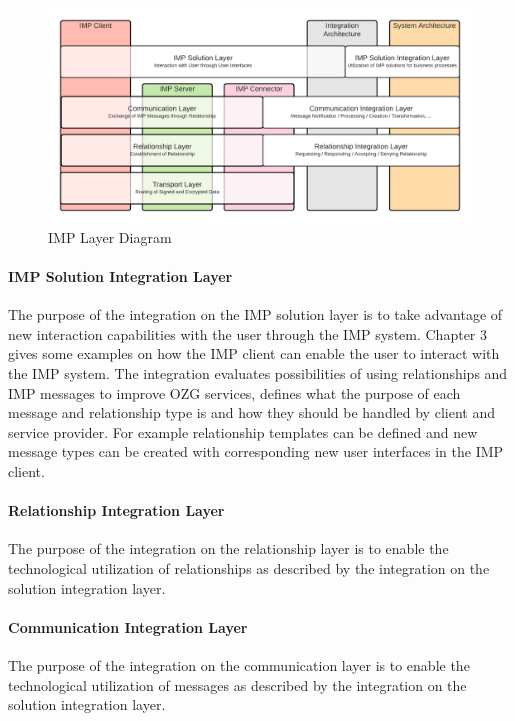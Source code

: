 \documentclass[
     12pt,         %
     a4paper,      %
     BCOR=10mm,version=first,     %
     DIV=14,version=first,        %
     ]{scrreprt}
\begin{document}
\begin{figure}[h]
\caption{IMP Layer Diagram}
    \centering
    \includegraphics[scale=0.3]{Diagrams/Integration Architecture 1/IMP Layer Diagram Integration.png}
\end{figure}

\paragraph{IMP Solution Integration Layer} 
The purpose of the integration on the IMP solution layer is to take advantage of new interaction capabilities with the user through the IMP system. Chapter 3 gives some examples on how the IMP client can enable the user to interact with the IMP system. The integration evaluates possibilities of using relationships and IMP messages to improve OZG services, defines what the purpose of each message and relationship type is and how they should be handled by client and service provider. For example relationship templates can be defined and new message types can be created with corresponding new user interfaces in the IMP client.

\paragraph{Relationship Integration Layer} The purpose of the integration on the relationship layer is to enable the technological utilization of relationships as described by the integration on the solution integration layer. 

\paragraph{Communication Integration Layer} The purpose of the integration on the communication layer is to enable the technological utilization of messages as described by the integration on the solution integration layer. 
\end{document}
